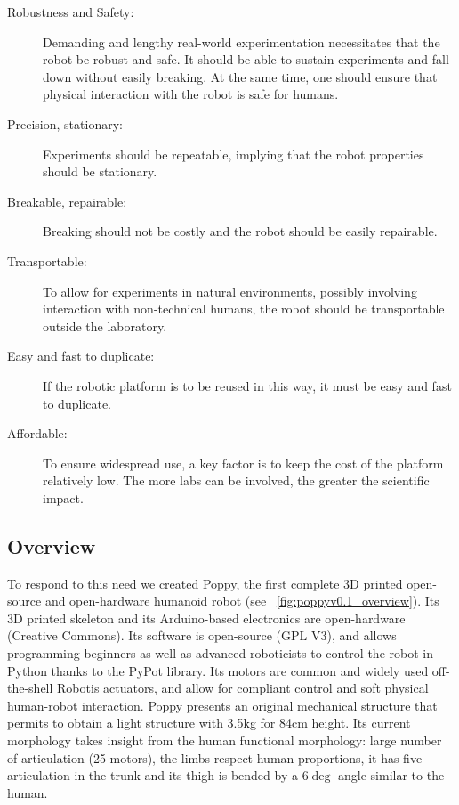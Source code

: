 \begin{description}
    \item[Robustness and Safety:] Demanding and lengthy real-world experimentation necessitates that the robot be robust and safe. It should be able to sustain experiments and fall down without easily breaking. At the same time, one should ensure that physical interaction with the robot is safe for humans.
    \item [Precision, stationary:]Experiments should be repeatable, implying that the robot properties should be stationary.
    \item [Breakable, repairable:] Breaking should not be costly and the robot should be easily repairable.
    \item [Transportable:] To allow for experiments in natural environments, possibly involving interaction with non-technical humans, the robot should be transportable outside the laboratory.
    \item [Easy and fast to duplicate:]If the robotic platform is to be reused  in this way, it must be easy and fast to duplicate.
    \item [Affordable:] To ensure widespread use, a key factor is to keep the cost of the platform relatively low. The more labs can be involved, the greater the scientific impact.
\end{description}


\subsection{Overview} %

To respond to this need we created Poppy,  the first complete 3D printed open-source and open-hardware humanoid robot (see \figurename~\ref{fig:poppyv0.1_overview}). Its 3D printed skeleton and its Arduino-based electronics are open-hardware (Creative Commons). Its software is open-source (GPL V3), and allows programming beginners as well as advanced roboticists to control the robot in Python thanks to the PyPot library. Its motors are common and widely used off-the-shell Robotis actuators, and allow for compliant control and soft physical human-robot interaction. Poppy presents an original mechanical structure that permits to obtain a light structure with 3.5kg for 84cm height.
Its current morphology takes insight from the human functional morphology: large number of articulation (25 motors), the limbs respect human proportions, it has five articulation in the trunk and its thigh is bended by a $6\deg$ angle similar to the human.

